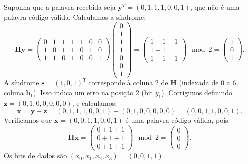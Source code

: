 \begin{example}
Suponha que a palavra recebida seja $\mathbf{y}^T = (0,1,1,1,0,0,1)$, 
que não é uma palavra-código válida. Calculamos a síndrome:
\begin{equation}
\mathbf{H} \mathbf{y} = \begin{pmatrix}
0 & 1 & 1 & 1 & 1 & 0 & 0 \\
1 & 0 & 1 & 1 & 0 & 1 & 0 \\
1 & 1 & 0 & 1 & 0 & 0 & 1
\end{pmatrix} 
\begin{pmatrix} 0 \\ 1 \\ 1 \\ 1 \\ 0 \\ 0 \\ 1 \end{pmatrix} = \begin{pmatrix} 1 + 1 + 1 \\ 1 + 1 \\ 1 + 1 + 1 \end{pmatrix} \mod 2 = \begin{pmatrix} 1 \\ 0 \\ 1 \end{pmatrix}.
\end{equation}
A síndrome $\mathbf{s} = (1,0,1)^T$ corresponde à coluna 2 de $\mathbf{H}$ (indexada de 0 a 6, coluna $\mathbf{h}_1$). 
Isso indica um erro na posição 2 (bit $y_1$). Corrigimos definindo $\mathbf{z} = (0,1,0,0,0,0,0)$, e calculamos:
\begin{equation}
\mathbf{x} = \mathbf{y} + \mathbf{z} = (0,1,1,1,0,0,1) + (0,1,0,0,0,0,0) = (0,0,1,1,0,0,1).
\end{equation}
Verificamos que $\mathbf{x} = (0,0,1,1,0,0,1)$ é uma palavra-código válida, pois:
\begin{equation}
\mathbf{H} \mathbf{x} = \begin{pmatrix} 0 + 1 + 1 \\ 0 + 1 + 1 \\ 0 + 1 + 1 \end{pmatrix} \mod 2 = \begin{pmatrix} 0 \\ 0 \\ 0 \end{pmatrix}.
\end{equation}
Os bits de dados são $(x_0, x_1, x_2, x_3) = (0,0,1,1)$.
\end{example}

